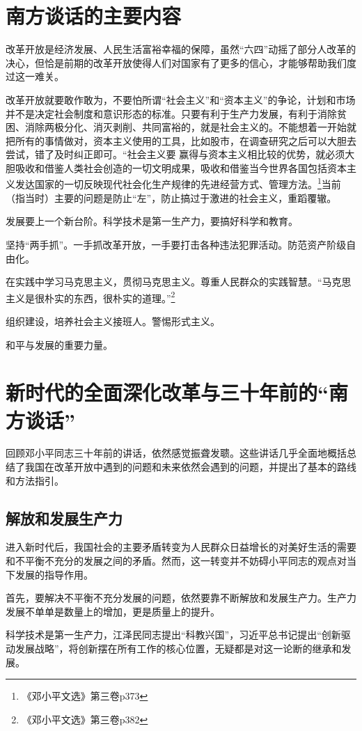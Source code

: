 \documentclass[12pt]{article}
\begin{document}
\section{南方谈话的主要内容}
改革开放是经济发展、人民生活富裕幸福的保障，虽然“六四”动摇了部分人改革的决心，但恰是前期的改革开放使得人们对国家有了更多的信心，才能够帮助我们度过这一难关。

改革开放就要敢作敢为，不要怕所谓“社会主义”和“资本主义”的争论，计划和市场并不是决定社会制度和意识形态的标准。只要有利于生产力发展，有利于消除贫困、消除两极分化、消灭剥削、共同富裕的，就是社会主义的。不能想着一开始就把所有的事情做对，资本主义使用的工具，比如股市，在调查研究之后可以大胆去尝试，错了及时纠正即可。“社会主义要 赢得与资本主义相比较的优势，就必须大胆吸收和借鉴人类社会创造的一切文明成果，吸收和借鉴当今世界各国包括资本主义发达国家的一切反映现代社会化生产规律的先进经营方式、管理方法。\footnote{《邓小平文选》第三卷p373}当前（指当时）主要的问题是防止“左”，防止搞过于激进的社会主义，重蹈覆辙。

发展要上一个新台阶。科学技术是第一生产力，要搞好科学和教育。

坚持“两手抓”。一手抓改革开放，一手要打击各种违法犯罪活动。防范资产阶级自由化。

在实践中学习马克思主义，贯彻马克思主义。尊重人民群众的实践智慧。“马克思主义是很朴实的东西，很朴实的道理。”\footnote{《邓小平文选》第三卷p382}

组织建设，培养社会主义接班人。警惕形式主义。

和平与发展的重要力量。

\section{新时代的全面深化改革与三十年前的“南方谈话”}
回顾邓小平同志三十年前的讲话，依然感觉振聋发聩。这些讲话几乎全面地概括总结了我国在改革开放中遇到的问题和未来依然会遇到的问题，并提出了基本的路线和方法指引。

\subsection{解放和发展生产力}
进入新时代后，我国社会的主要矛盾转变为人民群众日益增长的对美好生活的需要和不平衡不充分的发展之间的矛盾。然而，这一转变并不妨碍小平同志的观点对当下发展的指导作用。

首先，要解决不平衡不充分发展的问题，依然要靠不断解放和发展生产力。生产力发展不单单是数量上的增加，更是质量上的提升。

科学技术是第一生产力，江泽民同志提出“科教兴国”，习近平总书记提出“创新驱动发展战略”，将创新摆在所有工作的核心位置，无疑都是对这一论断的继承和发展。
\end{document}
